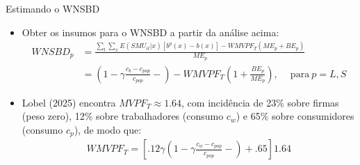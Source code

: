 \begin{frame}[label=payroll]{Estimando o WNSBD}
    \begin{itemize}
        \item Obter os insumos para o WNSBD a partir da análise acima:
        {\footnotesize
        \begin{align*}
            WNSBD_p & = \frac{\sum_t\sum_xE(SMU_{it}|x)[b^p(x)-b(x)]-{WMVPF_T}(ME_p+BE_p)}{ME_p} \\
            & = \left(1-\gamma \frac{c_b - c_{pop}}{c_{pop}}-\right) - {WMVPF_T}\left(1+\frac{BE_p}{ME_p}\right),\quad \ \text{para} \ p=L,S
        \end{align*}}
        
        
        \item Lobel (2025) encontra ${MVPF_T}\approx 1.64$, com incidência de 23\% sobre firmas (peso zero), 12\% sobre trabalhadores (consumo $c_w$) e 65\% sobre consumidores (consumo $c_p$), de modo que:
        \begin{align*}
            {WMVPF_T} = \left[.12\gamma \left(1-\gamma \frac{c_w - c_{pop}}{c_{pop}}-\right)+.65\right]1.64
        \end{align*}
    \end{itemize}
\end{frame}



